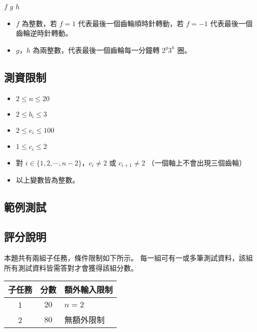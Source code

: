 \begin{format}
\f{
$f$ $g$ $h$
}
\end{format}

\begin{itemize}
\tightlist
\item
  \(f\) 為整數，若 \(f=1\) 代表最後一個齒輪順時針轉動，若 \(f=-1\)
  代表最後一個齒輪逆時針轉動。
\item
  \(g\)，\(h\) 為兩整數，代表最後一個齒輪每一分鐘轉 \(2^g3^h\) 圈。
\end{itemize}

\subsection{測資限制}

\begin{itemize}
\tightlist
\item
  \(2 \le n \le 20\)
\item
  \(2 \le b_i \le 3\)
\item
  \(2 \le e_i \le 100\)
\item
  \(1 \le c_i \le 2\)
\item
  對 \(i \in \{1, 2, \cdots, n-2\}\)，\(c_i \neq 2\) 或
  \(c_{i+1} \neq 2\) （一個軸上不會出現三個齒輪）
\item
  以上變數皆為整數。
\end{itemize}

\subsection{範例測試}

\begin{example}
%
%
\end{example}

\subsection{評分說明}

本題共有兩組子任務，條件限制如下所示。
每一組可有一或多筆測試資料，該組所有測試資料皆需答對才會獲得該組分數。

\begin{longtable}[]{@{}ccl@{}}
\toprule
子任務 & 分數 & 額外輸入限制 \\
\midrule
\endhead
1 & \(20\) & \(n = 2\) \\
2 & \(80\) & 無額外限制 \\
\bottomrule
\end{longtable}

